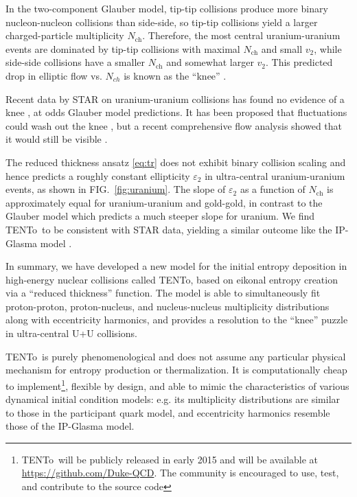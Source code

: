 \documentclass[aps,prc,reprint,amsmath,nofootinbib]{revtex4-1}
\newcommand{\trento}{T\raisebox{-.5ex}{R}ENTo}
\newcommand{\nch}{N_\text{ch}}
\begin{document}
In the two-component Glauber model, tip-tip collisions produce more binary nucleon-nucleon collisions than side-side, so tip-tip collisions yield a larger charged-particle multiplicity $\nch$.
Therefore, the most central uranium-uranium events are dominated by tip-tip collisions with maximal $\nch$ and small $v_2$, while side-side collisions have a smaller $\nch$ and somewhat larger $v_2$.
This predicted drop in elliptic flow vs. $N_{ch}$ is known as the ``knee'' \cite{Voloshin:2010ut}.

Recent data by STAR on uranium-uranium collisions has found no evidence of a knee \cite{FortheSTAR:2013bza,Wang:2014qxa}, at odds Glauber model predictions.
It has been proposed that fluctuations could wash out the knee \cite{Rybczynski:2012av}, but a recent comprehensive flow analysis showed that it would still be visible \cite{}.

The reduced thickness ansatz \eqref{eq:tr} does not exhibit binary collision scaling and hence predicts a roughly constant ellipticity $\varepsilon_2$ in ultra-central uranium-uranium events, as shown in FIG.~\ref{fig:uranium}.
The slope of $\varepsilon_2$ as a function of $\nch$ is approximately equal for uranium-uranium and gold-gold, in contrast to the Glauber model which predicts a much steeper slope for uranium. We find  \trento\ to be consistent with STAR data, yielding a similar outcome like the IP-Glasma model \cite{Wang:2014qxa}.


In summary, we have developed a new model for the initial entropy deposition in high-energy nuclear collisions called \trento,  based on
eikonal entropy creation via a ``reduced thickness'' function.  The model is able to simultaneously fit
proton-proton, proton-nucleus, and nucleus-nucleus multiplicity distributions along with  eccentricity harmonics, and provides a  resolution to the ``knee'' puzzle in ultra-central U+U
collisions.

 \trento\ is purely phenomenological and does not assume any particular physical mechanism for entropy production or thermalization.
It is computationally cheap to implement\footnote{\trento\ will be publicly released in early 2015 and will be available at \url{https://github.com/Duke-QCD}. The community is encouraged to use, test, and contribute to the source code}, flexible by design, and able to mimic the characteristics of various dynamical initial condition models:
e.g. its multiplicity distributions are similar to those in the participant quark model, and eccentricity harmonics resemble those of the IP-Glasma model.
\end{document}
